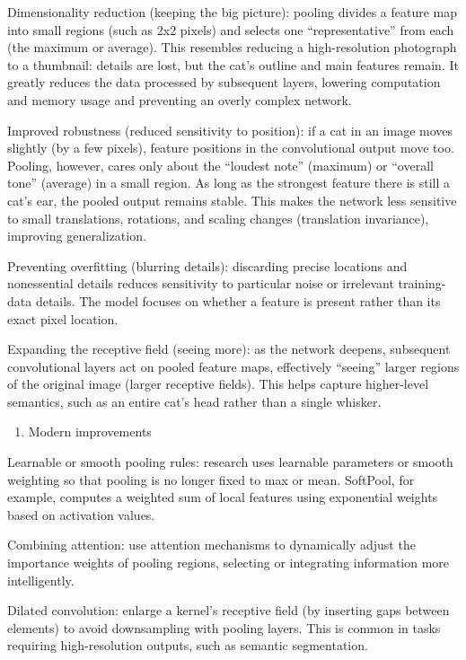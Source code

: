 Dimensionality reduction (keeping the big picture): pooling divides a feature map into small regions (such as 2x2 pixels) and selects one ``representative'' from each (the maximum or average). This resembles reducing a high-resolution photograph to a thumbnail: details are lost, but the cat's outline and main features remain. It greatly reduces the data processed by subsequent layers, lowering computation and memory usage and preventing an overly complex network.

Improved robustness (reduced sensitivity to position): if a cat in an image moves slightly (by a few pixels), feature positions in the convolutional output move too. Pooling, however, cares only about the ``loudest note'' (maximum) or ``overall tone'' (average) in a small region. As long as the strongest feature there is still a cat's ear, the pooled output remains stable. This makes the network less sensitive to small translations, rotations, and scaling changes (translation invariance), improving generalization.

Preventing overfitting (blurring details): discarding precise locations and nonessential details reduces sensitivity to particular noise or irrelevant training-data details. The model focuses on whether a feature is present rather than its exact pixel location.

Expanding the receptive field (seeing more): as the network deepens, subsequent convolutional layers act on pooled feature maps, effectively ``seeing'' larger regions of the original image (larger receptive fields). This helps capture higher-level semantics, such as an entire cat's head rather than a single whisker.

\begin{enumerate}
\def\labelenumi{(\arabic{enumi})}
\setcounter{enumi}{2}
\tightlist
\item
  Modern improvements
\end{enumerate}

Learnable or smooth pooling rules: research uses learnable parameters or smooth weighting so that pooling is no longer fixed to max or mean. SoftPool, for example, computes a weighted sum of local features using exponential weights based on activation values.

Combining attention: use attention mechanisms to dynamically adjust the importance weights of pooling regions, selecting or integrating information more intelligently.

Dilated convolution: enlarge a kernel's receptive field (by inserting gaps between elements) to avoid downsampling with pooling layers. This is common in tasks requiring high-resolution outputs, such as semantic segmentation.

